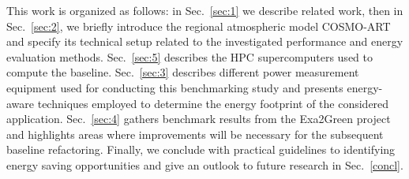 This work is organized as follows: in Sec.~\ref{sec:1} we describe related work, then in
Sec.~\ref{sec:2}, we briefly  introduce the regional atmospheric model
COSMO-ART and specify its  technical setup related to the investigated
performance and energy evaluation methods.  Sec.~\ref{sec:5} describes
the HPC supercomputers used to compute the baseline. Sec.~\ref{sec:3} describes
different  power  measurement  equipment  used  for  conducting  this
benchmarking  study and presents  energy-aware techniques  employed to
determine  the   energy  footprint  of   the  considered  application.
Sec.~\ref{sec:4} gathers benchmark  results from the Exa2Green project
and  highlights areas  where improvements  will be  necessary  for the
subsequent baseline refactoring.  Finally, we conclude with practical
guidelines  to identifying  energy  saving opportunities  and give  an
outlook to future research in Sec.~\ref{concl}.

